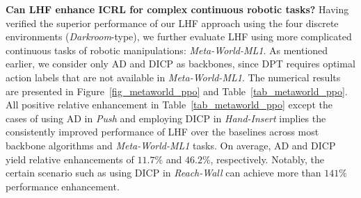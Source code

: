 \documentclass{article}
\begin{document}
\textbf{Can LHF enhance ICRL for complex continuous robotic tasks?}
Having verified the superior performance of our LHF approach using the four discrete environments (\textit{Darkroom}-type), we further evaluate LHF using more complicated continuous tasks of robotic manipulations: \textit{Meta-World-ML1}.
As mentioned earlier, we consider only AD and DICP as backbones, since DPT requires optimal action labels that are not available in \textit{Meta-World-ML1}.
The numerical results are presented in Figure~\ref{fig_metaworld_ppo} and Table~\ref{tab_metaworld_ppo}.
All positive relative enhancement in Table~\ref{tab_metaworld_ppo} except the cases of using AD in \textit{Push} and employing DICP in \textit{Hand-Insert} implies the consistently improved performance of LHF over the baselines across most backbone algorithms and \textit{Meta-World-ML1} tasks.
On average, AD and DICP yield relative enhancements of $11.7\%$ and $46.2\%$, respectively. Notably, the certain scenario such as using DICP in \textit{Reach-Wall} can achieve more than $141\%$ performance enhancement.
\end{document}
